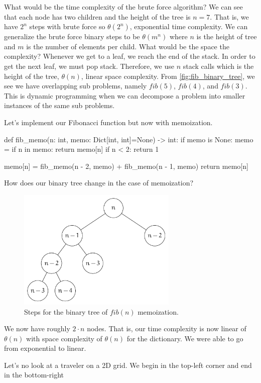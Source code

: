 \documentclass[12pt,dvipsnames,svgnames,x11names]{article}
\begin{document}
What would be the time complexity of the brute force algorithm? We can see that each node has two 
children and the height of the tree is \(n = 7\). That is, we have \(2^n\) steps with brute force so
\(\theta(2^n)\), exponential time complexity. We can generalize the brute force binary steps to be
\(\theta(m^n)\) where \(n\) is the height of tree and \(m\) is the number of elements per child. What 
would be the space the complexity? Whenever we get to a leaf, we reach the end of the stack. In order
to get the next leaf, we must pop stack. Therefore, we use \(n\) stack calls which is the height of the tree,
\(\theta(n)\), linear space complexity. From \cref{fig:fib_binary_tree}, we see we have overlapping sub
problems, namely \(fib(5)\), \(fib(4)\), and \(fib(3)\). This is dynamic programming when we can 
decompose a problem into smaller instances of the same sub problems.
\par\medskip
Let's implement our Fibonacci function but now with memoization.
\begin{python}
def fib_memo(n: int, memo: Dict[int, int]=None) -> int:
  if memo is None:
    memo = {}
  if n in memo:
    return memo[n]
  if n < 2:
    return 1
    
  memo[n] = fib_memo(n - 2, memo) + fib_memo(n - 1, memo)
  return memo[n]
\end{python}
How does our binary tree change in the case of memoization?
\begin{figure}[h]
	\centering
	\includegraphics[width=3in]{fib_memo.pdf}
	\caption{Steps for the binary tree of \(fib(n)\) memoization.}
	\label{fig:fib_memo}
\end{figure}
We now have roughly \(2\cdot n\) nodes. That is, our time complexity is now linear of \(\theta(n)\) with
space complexity of \(\theta(n)\) for the dictionary. We were able to go from exponential to linear.
\par\medskip
Let's no look at a traveler on a 2D grid. We begin in the top-left corner and end in the bottom-right
\end{document}
